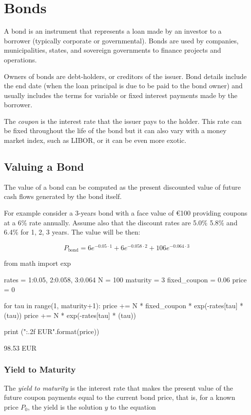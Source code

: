 \chapter{Bonds}
\label{bonds}

A bond is an instrument that represents a loan made by an investor to a borrower (typically corporate or governmental). Bonds are used by companies, municipalities, states, and sovereign governments to finance projects and operations. 

Owners of bonds are debt-holders, or creditors of the issuer. Bond details include the end date (when the loan principal is due to be paid to the bond owner) and usually includes the terms for variable or fixed interest payments made by the borrower.

The \emph{coupon} is the interest rate that the issuer pays to the holder. This rate can be fixed throughout the life of the bond but it can also vary with a money market index, such as LIBOR, or it can be even more exotic.

\section{Valuing a Bond}
\label{sec:bond_pricing}

The value of a bond can be computed as the present discounted value of future cash flows generated by the bond itself.

For example consider a 3-years bond with a face value of \euro{100} providing coupons at a 6\% rate annually. Assume also that the discount rates are 5.0\% 5.8\% and 6.4\% for 1, 2, 3 years. The value will be then:

\[P_{\mathrm{bond}}=6e^{-0.05\cdot 1}+6e^{-0.058\cdot 2}+106e^{-0.064\cdot 3}\]

\begin{ipython}
from math import exp

rates = {1:0.05, 2:0.058, 3:0.064}
N = 100
maturity = 3
fixed_coupon = 0.06
price = 0

for tau in range(1, maturity+1):
    price += N * fixed_coupon * exp(-rates[tau] * (tau))
price += N * exp(-rates[tau] * (tau))

print ("{:.2f} EUR".format(price))
\end{ipython}
\begin{ioutput}
98.53 EUR
\end{ioutput}

\subsection{Yield to Maturity}
The \emph{yield to maturity} is the interest rate that makes the present value of the future coupon payments equal to the current bond price, that is, for a known price $P_0$, the yield is the solution $y$ to the equation

